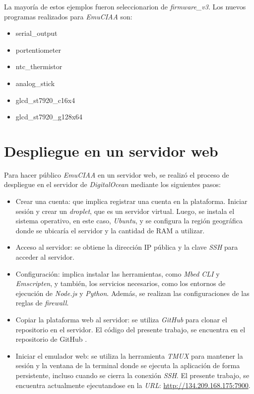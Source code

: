 La mayoría de estos ejemplos fueron seleccionarion de \textit{firmware\_v3}. Los nuevos programas realizados para \textit{EmuCIAA} son:

\begin{itemize}
    \item serial\_output
    \item portentiometer
    \item ntc\_thermistor
    \item analog\_stick
    \item glcd\_st7920\_c16x4
    \item glcd\_st7920\_g128x64 
\end{itemize}

\section{Despliegue en un servidor web}

Para hacer público \textit{EmuCIAA} en un servidor web, se realizó el proceso de despliegue en el servidor de \textit{DigitalOcean} mediante los siguientes pasos:

\begin{itemize}
	\item Crear una cuenta: que implica registrar una cuenta en la plataforma. Iniciar sesión y crear un \textit{droplet}, que es un servidor virtual. Luego, se instala el sistema operativo, en este caso, \textit{Ubuntu}, y se configura la región geográfica donde se ubicaría el servidor y la cantidad de RAM a utilizar.
	
	\item Acceso al servidor: se obtiene la dirección IP pública y la clave \textit{SSH} para acceder al servidor.
	
	\item Configuración: implica instalar las herramientas, como \textit{Mbed CLI} y \textit{Emscripten}, y también, los servicios necesarios, como los entornos de ejecución de \textit{Node.js} y \textit{Python}. Además, se realizan las configuraciones de las reglas de \textit{firewall}.

	\item Copiar la plataforma web al servidor: se utiliza \textit{GitHub} para clonar el repositorio en el servidor. El código del presente trabajo, se encuentra en el repositorio de GitHub \citep{repositorioEmulador}.
	
	\item Iniciar el emulador web: se utiliza la herramienta \textit{TMUX} para mantener la sesión y la ventana de la terminal donde se ejecuta la aplicación de forma persistente, incluso cuando se cierra la conexión \textit{SSH}. El presente trabajo, se encuentra actualmente ejecutandose en la \textit{URL}: \url{http://134.209.168.175:7900}.
\end{itemize}